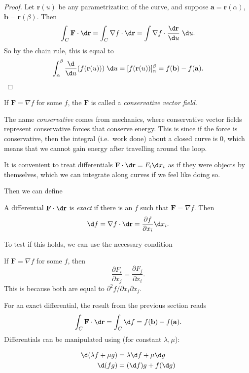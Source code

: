\documentclass[a4paper]{article}
\begin{document}
\begin{proof}
  Let $\mathbf{r}(u)$ be any parametrization of the curve, and suppose $\mathbf{a} = \mathbf{r}(\alpha)$, $\mathbf{b} = \mathbf{r}(\beta)$. Then
  \[
    \int_C \mathbf{F}\cdot \d \mathbf{r} = \int_C\nabla f\cdot \d \mathbf{r} = \int \nabla f\cdot \frac{\d \mathbf{r}}{\d u}\; \d u.
  \]
  So by the chain rule, this is equal to
  \[
    \int_\alpha^\beta \frac{\d }{\d u} (f(\mathbf{r}(u))) \;\d u = [f(\mathbf{r}(u))]_\alpha^\beta = f(\mathbf{b}) - f(\mathbf{a}).
  \]
\end{proof}

\begin{defi}
  If $\mathbf{F} = \nabla f$ for some $f$, the $\mathbf{F}$ is called a \emph{conservative vector field}.
\end{defi}

The name \emph{conservative} comes from mechanics, where conservative vector fields represent conservative forces that conserve energy. This is since if the force is conservative, then the integral (i.e.\ work done) about a closed curve is $0$, which means that we cannot gain energy after travelling around the loop.

It is convenient to treat differentials $\mathbf{F}\cdot \d \mathbf{r} = F_i \d x_i$ as if they were objects by themselves, which we can integrate along curves if we feel like doing so.

Then we can define
\begin{defi}
  A differential $\mathbf{F}\cdot\d \mathbf{r}$ is \emph{exact} if there is an $f$ such that $\mathbf{F} = \nabla f$. Then
  \[
    \d f = \nabla f\cdot \d \mathbf{r} = \frac{\partial f}{\partial x_i} \d x_i.
  \]
\end{defi}

To test if this holds, we can use the necessary condition
\begin{prop}
  If $\mathbf{F} = \nabla f$ for some $f$, then
  \[
    \frac{\partial F_i}{\partial x_j} = \frac{\partial F_j}{\partial x_i}.
  \]
  This is because both are equal to $\partial^2 f/\partial x_i\partial x_j$.
\end{prop}

For an exact differential, the result from the previous section reads
\[
  \int_C \mathbf{F}\cdot \d \mathbf{r} = \int_C \d f = f(\mathbf{b}) - f(\mathbf{a}).
\]
Differentials can be manipulated using (for constant $\lambda, \mu$):
\begin{prop}
  \begin{align*}
    \d (\lambda f + \mu g) &= \lambda \d f + \mu \d g\\
    \d (fg) &= (\d f)g + f(\d g)
  \end{align*}
\end{prop}
\end{document}
